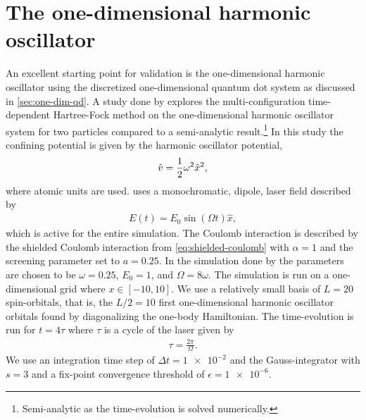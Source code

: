     \section{The one-dimensional harmonic oscillator}
        An excellent starting point for validation is the one-dimensional
        harmonic oscillator using the discretized one-dimensional quantum dot
        system as discussed in \autoref{sec:one-dim-qd}.
        A study done by \citeauthor{zanghellini_2004} \cite{zanghellini_2004}
        explores the multi-configuration time-dependent Hartree-Fock method on
        the one-dimensional harmonic oscillator system for two particles
        compared to a semi-analytic result.\footnote{%
            Semi-analytic as the time-evolution is solved numerically.
        }
        In this study the confining potential is given by the harmonic
        oscillator potential,
        \begin{align}
            \hat{v} = \frac{1}{2} \omega^2\hat{x}^2,
        \end{align}
        where atomic units are used.
        \citeauthor{zanghellini_2004} uses a monochromatic, dipole, laser field
        described by
        \begin{align}
            E(t) = E_0\sin(\Omega t)\hat{x},
        \end{align}
        which is active for the entire simulation.
        The Coulomb interaction is described by the shielded Coulomb interaction
        from \autoref{eq:shielded-coulomb} with $\alpha = 1$ and the screening
        parameter set to $a = 0.25$.
        In the simulation done by \citeauthor{zanghellini_2004} the parameters
        are chosen to be $\omega = 0.25$, $E_0 = 1$, and $\Omega = 8\omega$.
        The simulation is run on a one-dimensional grid where $x \in [-10, 10]$.
        We use a relatively small basis of $L = 20$ spin-orbitals, that is, the
        $L / 2 = 10$ first one-dimensional harmonic oscillator orbitals found by
        diagonalizing the one-body Hamiltonian.
        The time-evolution is run for $t = 4\tau$ where $\tau$ is a cycle of the
        laser given by
        \begin{align}
            \tau = \frac{2\pi}{\Omega}.
        \end{align}
        We use an integration time step of $\Delta t = \num{1e-2}$ and the
        Gauss-integrator with $s = 3$ and a fix-point convergence threshold of
        $\epsilon = \num{1e-6}$.

